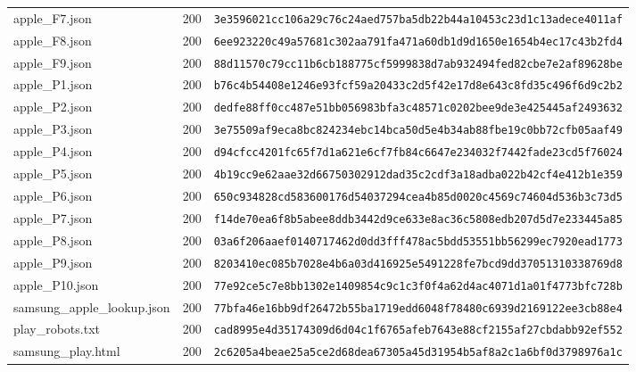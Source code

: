 \documentclass[10pt,a4paper]{article}
\begin{document}
\begin{longtable}{L{54mm}L{12mm}L{82mm}}
apple\_F7.json & 200 & \texttt{3e3596021cc106a29c76c24aed757ba5}\newline\texttt{db22b44a10453c23d1c13adece4011af} \\
apple\_F8.json & 200 & \texttt{6ee923220c49a57681c302aa791fa471}\newline\texttt{a60db1d9d1650e1654b4ec17c43b2fd4} \\
apple\_F9.json & 200 & \texttt{88d11570c79cc11b6cb188775cf59998}\newline\texttt{38d7ab932494fed82cbe7e2af89628be} \\
apple\_P1.json & 200 & \texttt{b76c4b54408e1246e93fcf59a20433c2}\newline\texttt{d5f42e17d8e643c8fd35c496f6d9c2b2} \\
apple\_P2.json & 200 & \texttt{dedfe88ff0cc487e51bb056983bfa3c4}\newline\texttt{8571c0202bee9de3e425445af2493632} \\
apple\_P3.json & 200 & \texttt{3e75509af9eca8bc824234ebc14bca50}\newline\texttt{d5e4b34ab88fbe19c0bb72cfb05aaf49} \\
apple\_P4.json & 200 & \texttt{d94cfcc4201fc65f7d1a621e6cf7fb84}\newline\texttt{c6647e234032f7442fade23cd5f76024} \\
apple\_P5.json & 200 & \texttt{4b19cc9e62aae32d66750302912dad35}\newline\texttt{c2cdf3a18adba022b42cf4e412b1e359} \\
apple\_P6.json & 200 & \texttt{650c934828cd583600176d54037294ce}\newline\texttt{a4b85d0020c4569c74604d536b3c73d5} \\
apple\_P7.json & 200 & \texttt{f14de70ea6f8b5abee8ddb3442d9ce63}\newline\texttt{3e8ac36c5808edb207d5d7e233445a85} \\
apple\_P8.json & 200 & \texttt{03a6f206aaef0140717462d0dd3fff47}\newline\texttt{8ac5bdd53551bb56299ec7920ead1773} \\
apple\_P9.json & 200 & \texttt{8203410ec085b7028e4b6a03d416925e}\newline\texttt{5491228fe7bcd9dd37051310338769d8} \\
apple\_P10.json & 200 & \texttt{77e92ce5c7e8bb1302e1409854c9c1c3}\newline\texttt{f0f4a62d4ac4071d1a01f4773bfc728b} \\
samsung\_apple\_lookup.json & 200 & \texttt{77bfa46e16bb9df26472b55ba1719edd}\newline\texttt{6048f78480c6939d2169122ee3cb88e4} \\
play\_robots.txt & 200 & \texttt{cad8995e4d35174309d6d04c1f6765af}\newline\texttt{eb7643e88cf2155af27cbdabb92ef552} \\
samsung\_play.html & 200 & \texttt{2c6205a4beae25a5ce2d68dea67305a4}\newline\texttt{5d31954b5af8a2c1a6bf0d3798976a1c} \\
\bottomrule\end{longtable}
\end{document}

